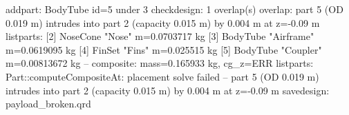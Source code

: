 \begin{console}
\ok addpart: BodyTube id=5 under 3
\err checkdesign: 1 overlap(s)
  overlap: part 5 (OD 0.019 m) intrudes into part 2 (capacity 0.015 m) by 0.004 m at z=-0.09 m
\ok listparts:
  [2] NoseCone "Nose"  m=0.0703717 kg
    [3] BodyTube "Airframe"  m=0.0619095 kg
      [4] FinSet "Fins"  m=0.025515 kg
      [5] BodyTube "Coupler"  m=0.00813672 kg
  -- composite: mass=0.165933 kg, cg_z=ERR listparts: Part::computeCompositeAt: placement solve failed -- part 5 (OD 0.019 m) intrudes into part 2 (capacity 0.015 m) by 0.004 m at z=-0.09 m
\ok savedesign: payload_broken.qrd
\end{console}
